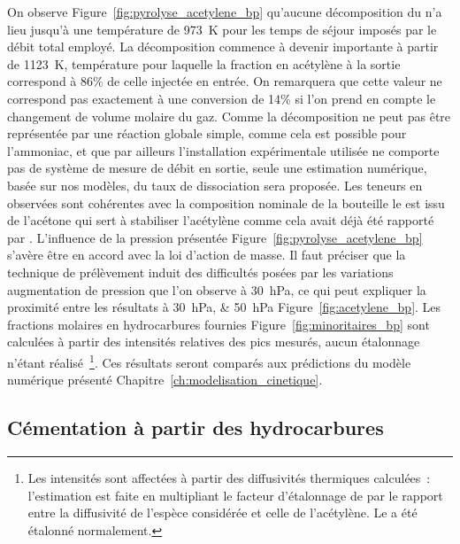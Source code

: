 On observe Figure~\ref{fig:pyrolyse_acetylene_bp} qu'aucune décomposition du  n'a lieu jusqu'à une température de \SI{973}{\kelvin} pour les temps de séjour imposés par le débit total employé. La décomposition commence à devenir importante à partir de \SI{1123}{\kelvin}, température pour laquelle la fraction en acétylène à la sortie correspond à 86\% de celle injectée en entrée. On remarquera que cette valeur ne correspond pas exactement à une conversion de 14\% si l'on prend en compte le changement de volume molaire du gaz. Comme la décomposition ne peut pas être représentée par une réaction globale simple, comme cela est possible pour l'ammoniac, et que par ailleurs l'installation expérimentale utilisée ne comporte pas de système de mesure de débit en sortie, seule une estimation numérique, basée sur nos modèles, du taux de dissociation sera proposée. Les teneurs en  observées sont cohérentes avec la composition nominale de la bouteille \textendash{} le  est issu de l'acétone qui sert à stabiliser l'acétylène \textendash{} comme cela avait déjà été rapporté par \citet{Norinaga2005}. L'influence de la pression présentée Figure~\ref{fig:pyrolyse_acetylene_bp} s'avère être en accord avec la loi d'action de masse. Il faut préciser que la technique de prélèvement induit des difficultés posées par les variations \textendash{} augmentation \textendash{} de pression que l'on observe à \SI{30}{\hecto\pascal}, ce qui peut expliquer la proximité entre les résultats à \SIlist{30;50}{\hecto\pascal} Figure~\ref{fig:acetylene_bp}. Les fractions molaires en hydrocarbures fournies Figure~\ref{fig:minoritaires_bp} sont calculées à partir des intensités relatives des pics mesurés, aucun étalonnage n'étant réalisé~\footnote{Les intensités sont affectées à partir des diffusivités thermiques calculées~\cite{Lienhard2008}: l'estimation est faite en multipliant le facteur d'étalonnage de  par le rapport entre la diffusivité de l'espèce considérée et celle de l'acétylène. Le  a été étalonné normalement.}. Ces résultats seront comparés aux prédictions du modèle numérique présenté Chapitre~\ref{ch:modelisation_cinetique}.

\subsection{Cémentation à partir des hydrocarbures}
\label{sec:cementation-hydrocarbure}

